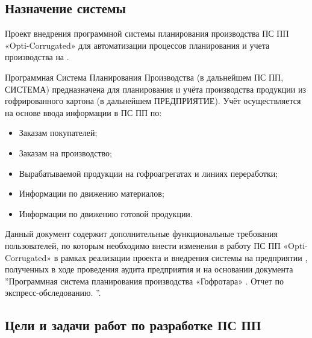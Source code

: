 



\subsection{Назначение системы}
Проект внедрения программной системы планирования производства ПС ПП «Opti-Corrugated» для автоматизации процессов планирования и учета производства на \FIRMA.

Программная Система Планирования Производства  \quad (в дальнейшем ПС ПП, СИСТЕМА) предназначена для планирования и учёта производства продукции из гофрированного картона \FIRMA (в дальнейшем ПРЕДПРИЯТИЕ). Учёт осуществляется на основе ввода информации в ПС ПП по:
\begin{itemize}
    \item Заказам покупателей;
    \item Заказам на производство; 
    \item Вырабатываемой продукции на гофроагрегатах и линиях переработки;
    \item Информации по движению материалов; 
    \item Информации по движению готовой продукции.
\end{itemize}

Данный документ содержит дополнительные функциональные требования пользователей, по которым необходимо внести изменения в работу ПС ПП «Opti-Corrugated» в рамках реализации проекта и внедрения системы на предприятии  \FIRMA, полученных в ходе проведения аудита предприятия и на основании документа
''Программная система планирования производства «Гофротара» \FIRMA. Отчет по экспресс-обследованию. \ESKDNUM''.


\subsection{Цели и задачи работ по разработке ПС ПП}


